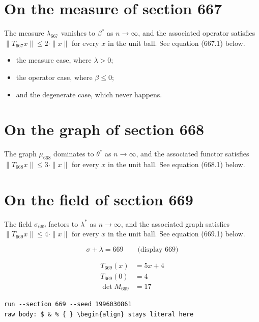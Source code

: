 \documentclass{article}
\begin{document}
\section{On the measure of section 667}
The measure $\lambda_{667}$ vanishes to $\beta^{*}$ as $n \to \infty$,
and the associated operator satisfies $\|T_{667} x\| \leq 2 \cdot \|x\|$
for every $x$ in the unit ball. See equation (667.1) below.

\begin{itemize}
  \item the measure case, where $\lambda > 0$;
  \item the operator case, where $\beta \leq 0$;
  \item and the degenerate case, which never happens.
\end{itemize}

\section{On the graph of section 668}
The graph $\mu_{668}$ dominates to $\theta^{*}$ as $n \to \infty$,
and the associated functor satisfies $\|T_{668} x\| \leq 3 \cdot \|x\|$
for every $x$ in the unit ball. See equation (668.1) below.

\section{On the field of section 669}
The field $\sigma_{669}$ factors to $\lambda^{*}$ as $n \to \infty$,
and the associated graph satisfies $\|T_{669} x\| \leq 4 \cdot \|x\|$
for every $x$ in the unit ball. See equation (669.1) below.

$$
\sigma + \lambda = 669 \qquad \text{(display 669)}
$$

\begin{align}
T_{669}(x) &= 5 x + 4 \\
T_{669}(0) &= 4 \\
\det M_{669} &= 17
\end{align}

\begin{verbatim}
run --section 669 --seed 1996030861
raw body: $ & % { } \begin{align} stays literal here
\end{verbatim}
\end{document}
